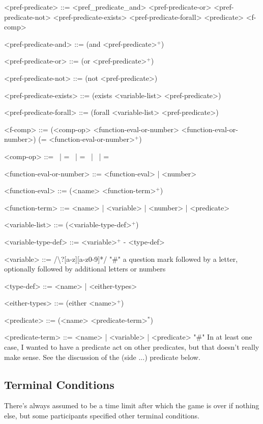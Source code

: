 \documentclass{article}
\begin{document}
\begin{grammar}
<pref-predicate> ::= <pref_predicate_and> \alt
    <pref-predicate-or> \alt
    <pref-predicate-not> \alt
    <pref-predicate-exists> \alt
    <pref-predicate-forall> \alt
    <predicate>
    <f-comp>

<pref-predicate-and> ::= (and <pref-predicate>$^+$)

<pref-predicate-or> ::= (or <pref-predicate>$^+$)

<pref-predicate-not> ::= (not <pref-predicate>)

<pref-predicate-exists> ::= (exists <variable-list> <pref-predicate>)

<pref-predicate-forall> ::= (forall <variable-list> <pref-predicate>)


<f-comp> ::= (<comp-op> <function-eval-or-number> <function-eval-or-number>) \alt
    (= <function-eval-or-number>$^+$)
    
<comp-op> ::=  \textlangle \ | \textlangle = \ | = \ | \textrangle \ | \textrangle =

<function-eval-or-number> ::= <function-eval> | <number>

<function-eval> ::= (<name> <function-term>$^+$)

<function-term> ::= <name> | <variable> | <number> | <predicate>

<variable-list> ::= (<variable-type-def>$^+$)

<variable-type-def> ::= <variable>$^+$ - <type-def>

<variable> ::= /\textbackslash?[a-z][a-z0-9]*/  "#" a question mark followed by a letter, optionally followed by additional letters or numbers

<type-def> ::= <name> | <either-types>

<either-types> ::= (either <name>$^+$)

<predicate> ::= (<name> <predicate-term>$^*$)

<predicate-term> ::= <name> | <variable> | <predicate> "#" In at least one case, I wanted to have a predicate act on other predicates, but that doesn't really make sense. See the discussion of the (side ...) predicate below.


\end{grammar}



\subsection{Terminal Conditions}
There's always assumed to be a time limit after which the game is over if nothing else, but some participants specified other terminal conditions.
        
\end{document}
